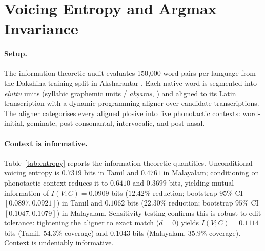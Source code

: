 \documentclass[11pt]{article}
\begin{document}
\section{Voicing Entropy and Argmax Invariance}
\label{sec:entropy}

\paragraph{Setup.} The information-theoretic audit evaluates 150{,}000 word pairs per language from the Dakshina training split
\cite{roark-etal-2020-processing} in Aksharantar \cite{madhani-etal-2023-aksharantar}. Each native
word is segmented into \textit{e\d{l}uttu} units (syllabic graphemic units / \textit{ak\d{s}aras}, \citealt{niklas1988tamil}) and aligned to its Latin transcription with a dynamic-programming
aligner over candidate transcriptions. The aligner categorises every aligned plosive into five phonotactic
contexts: word-initial, geminate, post-consonantal, intervocalic, and post-nasal.




\paragraph{Context is informative.} Table~\ref{tab:entropy} reports the information-theoretic
quantities. Unconditional voicing entropy is $0.7319$ bits in Tamil and $0.4761$ in Malayalam;
conditioning on phonotactic context reduces it to $0.6410$ and $0.3699$ bits, yielding mutual
information of $I(V;C) = 0.0909$ bits ($12.42\%$ reduction; bootstrap $95\%$ CI $[0.0897, 0.0921]$)
in Tamil and $0.1062$ bits ($22.30\%$ reduction; bootstrap $95\%$ CI $[0.1047, 0.1079]$) in Malayalam.
Sensitivity testing confirms this is robust to edit tolerance: tightening the aligner to exact match ($d=0$)
yields $I(V;C) = 0.1114$ bits (Tamil, $54.3\%$ coverage) and $0.1043$ bits (Malayalam, $35.9\%$ coverage).
Context is undeniably informative.
\end{document}
